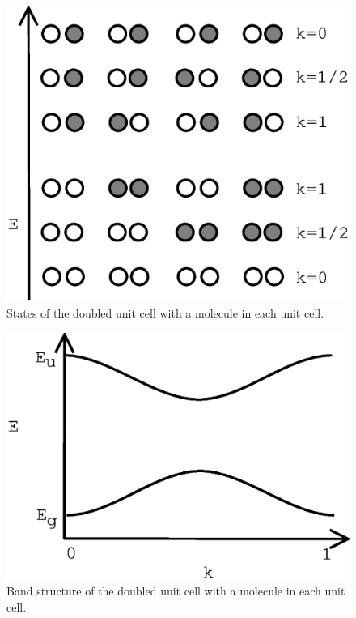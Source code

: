 \begin{figure}
\begin{center}
\includegraphics[scale=0.5]{1d-h2-states.eps}
\caption{States of the doubled unit cell with a  molecule in
each unit cell.}
\label{1d-h2-states}
\end{center}
\end{figure}

\begin{figure}
\begin{center}
\includegraphics[scale=0.5]{1d-h2-bands.eps}
\caption{Band structure of the doubled unit cell with a 
molecule in each unit cell.}
\label{1d-h2-bands}
\end{center}
\end{figure}

